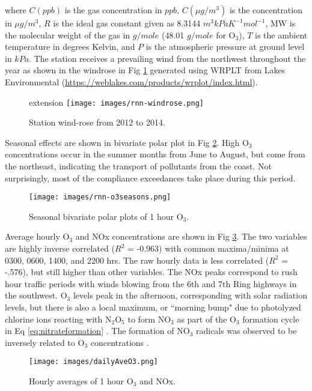 \noindent
where $C(ppb)$ is the gas concentration in $ppb$, $C(\mu g/m^{3})$ is the concentration in $\mu g/m^{3}$, $R$ is the ideal gas constant given as 8.3144 $m^{3}kPa K^{-1}mol^{-1}$, MW is the molecular weight of the gas in $g/mole$ (48.01 $g/mole$ for O$_{3}$), $T$ is the ambient temperature in degrees Kelvin, and $P$ is the atmospheric pressure at ground level in $kPa$. The station receives a prevailing wind from the northwest throughout the year as shown in the windrose in Fig \ref{fig:windrose} generated using WRPLT from Lakes Environmental (\url{https://weblakes.com/products/wrplot/index.html}).
%
\begin{figure}[H]
\centering
 extension
\texttt{[image: images/rnn-windrose.png]} 
\caption{Station wind-rose from 2012 to 2014.}
\label{fig:windrose}
\end{figure}
%
Seasonal effects are shown in bivariate polar plot in Fig \ref{fig:bipolarplots}. High O$_{3}$ concentrations occur in the summer months from June to August, but come from the northeast, indicating the transport of pollutants from the coast. Not surprisingly, most of the compliance exceedances take place during this period.
%
\begin{figure}[H]
\centering
\texttt{[image: images/rnn-o3seasons.png]} 
\caption{Seasonal bivariate polar plots of 1 hour O$_3$.}
\label{fig:bipolarplots}
\end{figure}
%
Average hourly O$_{3}$ and NOx concentrations are shown in Fig \ref{fig:hourlyAveO3}. The two variables are highly inverse correlated ($R^{2}$ = -0.963) with common maxima/minima at 0300, 0600, 1400, and 2200 hrs. The raw hourly data is less correlated ($R^{2}$ = -.576), but still higher than other variables. The NOx peaks correspond to rush hour traffic periods with winds blowing from the 6th and 7th Ring highways in the southwest. O$_{3}$ levels peak in the afternoon, corresponding with solar radiation levels, but there is also a local maximum, or ``morning bump" due to photolyzed chlorine ions reacting with N$_{2}$O$_{5}$ to form NO$_{3}$ as part of the O$_{3}$ formation cycle in Eq \ref{eq:nitrateformation} \citep{Calvert2015}. The formation of NO$_{3}$ radicals was observed to be inversely related to O$_{3}$ concentrations \citep{Song2011}.
%
\begin{figure}[H]
\centering
\texttt{[image: images/dailyAveO3.png]}
\caption{Hourly averages of 1 hour O$_{3}$ and NOx.}
\label{fig:hourlyAveO3}
\end{figure}
%

